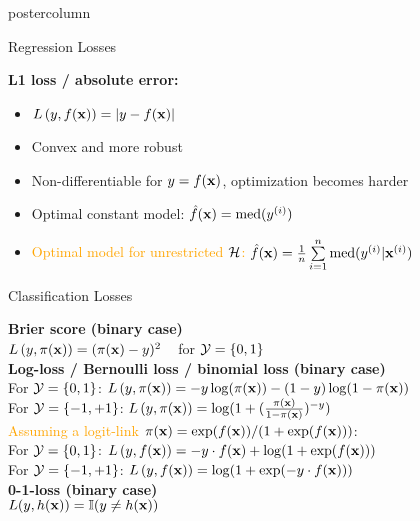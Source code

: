 \documentclass{beamer}
\begin{document}
\begin{frame}[fragile]{}
\begin{columns}
\begin{column}{.31\textwidth}
\begin{beamercolorbox}[center]{postercolumn}
\begin{minipage}{.98\textwidth}
{\begin{myblock}{Regression Losses}
\vspace*{1ex}


  \textbf{L1 loss / absolute error:} 
\begin{itemize}
\setlength{\itemindent}{+.3in}
  \item $L\left(y, f(\mathbf{x})\right) = |y-f(\mathbf{x})|$
  \item Convex and more robust
  \item Non-differentiable for $y = f(\mathbf{x})$, optimization becomes harder
  \item Optimal constant model: $\hat{f}(\mathbf{x}) = \text{med}(y^{(i)})$
  \item \textcolor{orange}{Optimal model for unrestricted $\mathcal{H}$: $\hat{f}(\mathbf{x}) = \frac{1}{n} \sum\limits_{i=1}^n \text{med}(y^{(i)} | \mathbf{x}^{(i)})$}
\end{itemize}
\end{myblock}


\begin{myblock}{Classification Losses}


\textbf{Brier score (binary case)} \\
$L\left(y, \pi(\mathbf{x})\right) = (\pi(\mathbf{x}) - y)^2$ ~ for $\mathcal{Y} = \{0, 1\}$ \\

\textbf{Log-loss / Bernoulli loss / binomial loss (binary case)}\\
For $\mathcal{Y} = \{0, 1\}$: $L\left(y, \pi(\mathbf{x})\right) = -y \log(\pi(\mathbf{x})) - (1-y) \log(1-\pi(\mathbf{x}))$ \\
For $\mathcal{Y} = \{-1, +1\}$: $L\left(y, \pi(\mathbf{x})\right) = \log(1 + (\frac{\pi(\mathbf{x})}{1-\pi(\mathbf{x})})^{-y})$ \\
\textcolor{orange}{Assuming a logit-link $\pi(\mathbf{x}) = \exp(f(\mathbf{x})) / ( 1+\exp(f(\mathbf{x})))$}:\\
For $\mathcal{Y} = \{0, 1\}$: $L\left(y, f(\mathbf{x})\right) = -y \cdot f(\mathbf{x}) + \log(1 + \exp(f(\mathbf{x})))$ \\
For $\mathcal{Y} = \{-1, +1\}$: $L\left(y, f(\mathbf{x})\right) = \log(1 + \exp(- y \cdot f(\mathbf{x})))$ \\

\textbf{0-1-loss (binary case)}\\
\textcolor{orange}{$L (y, h(\mathbf{x})) = \mathbb{I}(y \neq h(\mathbf{x}))$}\\


\end{myblock}}
\end{minipage}
\end{beamercolorbox}
\end{column}
\end{columns}
\end{frame}
\end{document}
